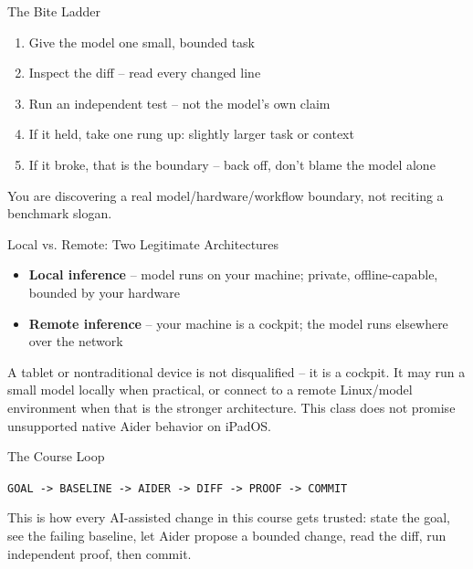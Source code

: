 \documentclass[aspectratio=169]{beamer}
\begin{document}
\begin{conceptframe}{The Bite Ladder}
  \begin{enumerate}
    \item Give the model one small, bounded task
    \item Inspect the diff -- read every changed line
    \item Run an independent test -- not the model's own claim
    \item If it held, take one rung up: slightly larger task or context
    \item If it broke, that is the boundary -- back off, don't blame the model alone
  \end{enumerate}

  \vspace{2mm}
  You are discovering a real model/hardware/workflow boundary, not
  reciting a benchmark slogan.
\end{conceptframe}

\begin{conceptframe}{Local vs. Remote: Two Legitimate Architectures}
  \begin{itemize}
    \item \textbf{Local inference} -- model runs on your machine; private, offline-capable, bounded by your hardware
    \item \textbf{Remote inference} -- your machine is a cockpit; the model runs elsewhere over the network
  \end{itemize}

  \vspace{2mm}
  A tablet or nontraditional device is not disqualified -- it is a
  cockpit. It may run a small model locally when practical, or connect
  to a remote Linux/model environment when that is the stronger
  architecture. This class does not promise unsupported native Aider
  behavior on iPadOS.
\end{conceptframe}

\begin{odysseyframe}{The Course Loop}
  \begin{center}
    \Large\color{cs2primary}
    \texttt{GOAL -> BASELINE -> AIDER -> DIFF -> PROOF -> COMMIT}
  \end{center}

  \vspace{3mm}
  This is how every AI-assisted change in this course gets trusted:
  state the goal, see the failing baseline, let Aider propose a bounded
  change, read the diff, run independent proof, then commit.
\end{odysseyframe}
\end{document}
